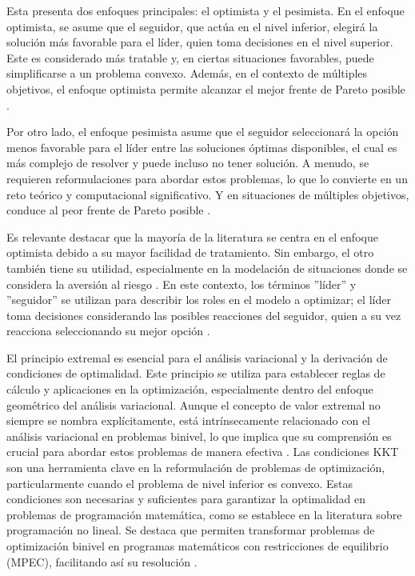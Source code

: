 Esta presenta dos enfoques principales: el optimista y el pesimista. En el enfoque optimista, se asume que el seguidor, que actúa en el nivel inferior, elegirá la solución más favorable para el líder, quien toma decisiones en el nivel superior. Este es considerado más tratable y, en ciertas situaciones favorables, puede simplificarse a un problema convexo. Además, en el contexto de múltiples objetivos, el enfoque optimista permite alcanzar el mejor frente de Pareto posible \cite{DempeyZemkoho2020}.

Por otro lado, el enfoque pesimista asume que el seguidor seleccionará la opción menos favorable para el líder entre las soluciones óptimas disponibles, el cual es más complejo de resolver y puede incluso no tener solución. A menudo, se requieren reformulaciones para abordar estos problemas, lo que lo convierte en un reto teórico y computacional significativo. Y en situaciones de múltiples objetivos, conduce al peor frente de Pareto posible \cite{Sinha2017ARO}.

Es relevante destacar que la mayoría de la literatura se centra en el enfoque optimista debido a su mayor facilidad de tratamiento. Sin embargo, el otro también tiene su utilidad, especialmente en la modelación de situaciones donde se considera la aversión al riesgo \cite{DempeyZemkoho2020}. En este contexto, los términos ''líder'' y ''seguidor'' se utilizan para describir los roles en el modelo a optimizar; el líder toma decisiones considerando las posibles reacciones del seguidor, quien a su vez reacciona seleccionando su mejor opción \cite{Sinha2017ARO}.

El principio extremal es esencial para el análisis variacional y la derivación de condiciones de optimalidad. Este principio se utiliza para establecer reglas de cálculo y aplicaciones en la optimización, especialmente dentro del enfoque geométrico del análisis variacional. Aunque el concepto de valor extremal no siempre se nombra explícitamente, está intrínsecamente relacionado con el análisis variacional en problemas binivel, lo que implica que su comprensión es crucial para abordar estos problemas de manera efectiva \cite{DempeyZemkoho2020}. Las condiciones KKT son una herramienta clave en la reformulación de problemas de optimización, particularmente cuando el problema de nivel inferior es convexo. Estas condiciones son necesarias y suficientes para garantizar la optimalidad en problemas de programación matemática, como se establece en la literatura sobre programación no lineal. Se destaca que permiten transformar problemas de optimización binivel en programas matemáticos con restricciones de equilibrio (MPEC), facilitando así su resolución \cite{DempeyZemkoho2020}.


